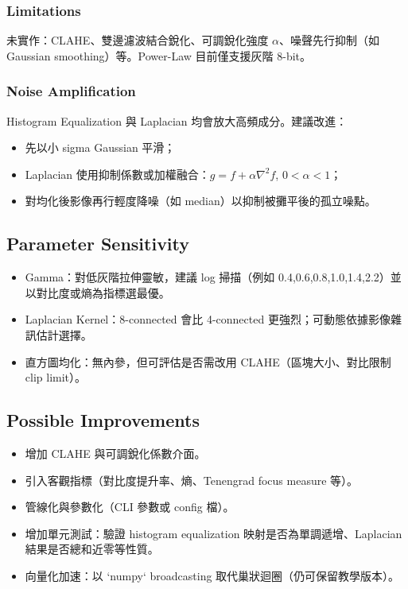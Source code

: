\documentclass[12pt,a4paper]{article}
\begin{document}
\subsubsection{Limitations}
未實作：CLAHE、雙邊濾波結合銳化、可調銳化強度 \(\alpha\)、噪聲先行抑制（如 Gaussian smoothing）等。Power-Law 目前僅支援灰階 8-bit。
\subsubsection{Noise Amplification}
Histogram Equalization 與 Laplacian 均會放大高頻成分。建議改進：
\begin{itemize}
  \item 先以小 sigma Gaussian 平滑；
  \item Laplacian 使用抑制係數或加權融合：\(g = f + \alpha \nabla^2 f\), \(0<\alpha<1\)；
  \item 對均化後影像再行輕度降噪（如 median）以抑制被攤平後的孤立噪點。
\end{itemize}
\subsection{Parameter Sensitivity}
\begin{itemize}
  \item Gamma：對低灰階拉伸靈敏，建議 log 掃描（例如 0.4,0.6,0.8,1.0,1.4,2.2）並以對比度或熵為指標選最優。
  \item Laplacian Kernel：8-connected 會比 4-connected 更強烈；可動態依據影像雜訊估計選擇。
  \item 直方圖均化：無內參，但可評估是否需改用 CLAHE（區塊大小、對比限制 clip limit）。
\end{itemize}
\subsection{Possible Improvements}
\begin{itemize}
  \item 增加 CLAHE 與可調銳化係數介面。
  \item 引入客觀指標（對比度提升率、熵、Tenengrad focus measure 等）。
  \item 管線化與參數化（CLI 參數或 config 檔）。
  \item 增加單元測試：驗證 histogram equalization 映射是否為單調遞增、Laplacian 結果是否總和近零等性質。
  \item 向量化加速：以 `numpy` broadcasting 取代巢狀迴圈（仍可保留教學版本）。
\end{itemize}
\end{document}
